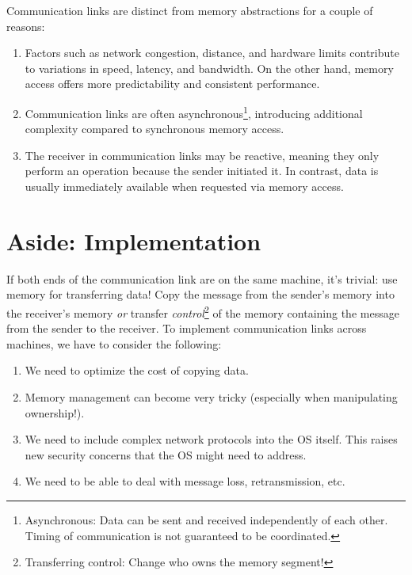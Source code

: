 \documentclass{report}
\begin{document}
Communication links are distinct from memory abstractions for a couple of reasons:
\begin{enumerate}[label=\textit{(\roman*)}]
\item Factors such as network congestion, distance, and hardware limits contribute to variations in
  speed, latency, and bandwidth. On the other hand, memory access offers more predictability and
  consistent performance.  

\item Communication links are often asynchronous\footnote{Asynchronous: Data can be sent and
    received independently of each other. Timing of communication is not guaranteed to be
    coordinated.}, introducing additional complexity compared to synchronous memory access. 

\item The receiver in communication links may be reactive, meaning they only perform an operation
  because the sender initiated it. In contrast, data is usually immediately available when requested
  via memory access. 
\end{enumerate}


\section*{Aside: Implementation}
If both ends of the communication link are on the same machine, it's trivial: use memory for
transferring data! Copy the message from the sender's memory into the receiver's memory \textit{or}
transfer \textit{control}\footnote{Transferring control: Change who owns the memory segment!} of the memory
containing the message from the sender to the receiver. To implement communication links across
machines, we have to consider the following:

\begin{enumerate}[label=\textit{(\roman*)}]
\item We need to optimize the cost of copying data.
\item Memory management can become very tricky (especially when manipulating ownership!).
\item We need to include complex network protocols into the OS itself. This raises new security
  concerns that the OS might need to address.
\item We need to be able to deal with message loss, retransmission, etc.
\end{enumerate}
\end{document}
